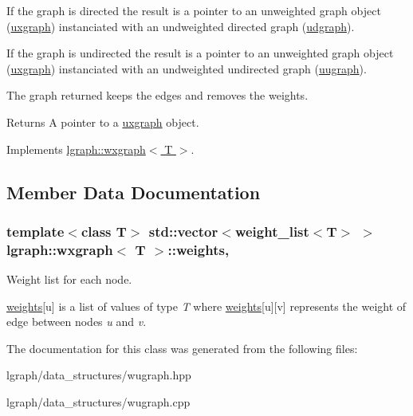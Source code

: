 If the graph is directed the result is a pointer to an unweighted graph object (\hyperlink{classlgraph_1_1uxgraph}{uxgraph}) instanciated with an undweighted directed graph (\hyperlink{classlgraph_1_1udgraph}{udgraph}).

If the graph is undirected the result is a pointer to an unweighted graph object (\hyperlink{classlgraph_1_1uxgraph}{uxgraph}) instanciated with an undweighted undirected graph (\hyperlink{classlgraph_1_1uugraph}{uugraph}).

The graph returned keeps the edges and removes the weights.

\begin{DoxyReturn}{Returns}
A pointer to a \hyperlink{classlgraph_1_1uxgraph}{uxgraph} object. 
\end{DoxyReturn}


Implements \hyperlink{classlgraph_1_1wxgraph_a7fcd56f02a50591ba3ce5e5c7792b4aa}{lgraph\-::wxgraph$<$ T $>$}.



\subsection{Member Data Documentation}
\hypertarget{classlgraph_1_1wxgraph_a6f8c983edc82913c2d78b7bc871defe8}{
\subsubsection[{weights}]{\setlength{\rightskip}{0pt plus 5cm}template$<$class T$>$ std\-::vector$<${\bf weight\-\_\-list}$<$T$>$ $>$ {\bf lgraph\-::wxgraph}$<$ T $>$\-::weights\hspace{0.3cm}{\ttfamily [protected]}, {\ttfamily [inherited]}}}\label{classlgraph_1_1wxgraph_a6f8c983edc82913c2d78b7bc871defe8}


Weight list for each node. 

\hyperlink{classlgraph_1_1wxgraph_a6f8c983edc82913c2d78b7bc871defe8}{weights}\mbox{[}u\mbox{]} is a list of values of type {\itshape T} where \hyperlink{classlgraph_1_1wxgraph_a6f8c983edc82913c2d78b7bc871defe8}{weights}\mbox{[}u\mbox{]}\mbox{[}v\mbox{]} represents the weight of edge between nodes {\itshape u} and {\itshape v}. 

The documentation for this class was generated from the following files\-:\begin{DoxyCompactItemize}
\item 
lgraph/data\-\_\-structures/wugraph.\-hpp\item 
lgraph/data\-\_\-structures/wugraph.\-cpp\end{DoxyCompactItemize}
